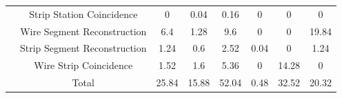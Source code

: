 \begin{table}[]
\begin{tabular}{|c|c|c|c|c|c|c|c|}
                                                                                & Strip Station Coincidence    & 0                                                         & 0.04                                                      & 0.16                                                     & 0                                                                 & 0                                                      & 0                                                      \\ \cline{2-8} 
                                                                                & Wire Segment Reconstruction  & 6.4                                                       & 1.28                                                      & 9.6                                                      & 0                                                                 & 0                                                      & 19.84                                                  \\ \cline{2-8} 
                                                                                & Strip Segment Reconstruction & 1.24                                                      & 0.6                                                       & 2.52                                                     & 0.04                                                              & 0                                                      & 1.24                                                   \\ \cline{2-8} 
                                                                                & Wire Strip Coincidence       & 1.52                                                      & 1.6                                                       & 5.36                                                     & 0                                                                 & 14.28                                                  & 0                                                      \\ \cline{2-8} 
                                                                                & Total                        & 25.84                                                     & 15.88                                                     & 52.04                                                    & 0.48                                                              & 32.52                                                  & 20.32                                                  \\ \hline
    \end{tabular}
\end{table}

